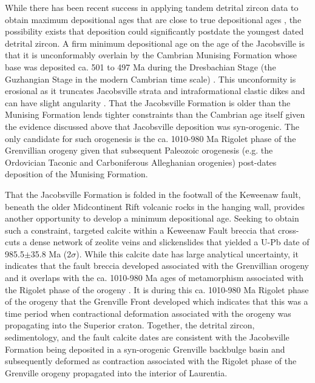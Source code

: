 \documentclass[draft]{agujournal2019}
\begin{document}
While there has been recent success in applying tandem detrital zircon data to obtain maximum depositional ages that are close to true depositional ages \cite{Karlstrom2020a}, the possibility exists that deposition could significantly postdate the youngest dated detrital zircon. A firm minimum depositional age on the age of the Jacobsville is that it is unconformably overlain by the Cambrian Munising Formation whose base was deposited ca. 501 to 497 Ma during the Dresbachian Stage (the Guzhangian Stage in the modern Cambrian time scale) \cite{Hamblin1958a, Haddox1990a}. This unconformity is erosional as it truncates Jacobsville strata and intraformational clastic dikes and can have slight angularity \cite{Hamblin1958a, Haddox1990a}. That the Jacobsville Formation is older than the Munising Formation lends tighter constraints than the Cambrian age itself given the evidence discussed above that Jacobsville deposition was syn-orogenic. The only candidate for such orogenesis is the ca. 1010-980 Ma Rigolet phase of the Grenvillian orogeny given that subsequent Paleozoic orogenesis (e.g. the Ordovician Taconic and Carboniferous Alleghanian orogenies) post-dates deposition of the Munising Formation.

That the Jacobsville Formation is folded in the footwall of the Keweenaw fault, beneath the older Midcontinent Rift volcanic rocks in the hanging wall, provides another opportunity to develop a minimum depositional age. Seeking to obtain such a constraint,  targeted calcite within a Keweenaw Fault breccia that cross-cuts a dense network of zeolite veins and slickenslides that yielded a U-Pb date of 985.5$\pm$35.8 Ma (2$\sigma$). While this calcite date has large analytical uncertainty, it indicates that the fault breccia developed associated with the Grenvillian orogeny and it overlaps with the ca. 1010-980 Ma ages of metamorphism associated with the Rigolet phase of the orogeny \cite{Swanson-Hysell2023a}. It is during this ca. 1010-980 Ma Rigolet phase of the orogeny that the Grenville Front developed \cite{Rivers2008a} which indicates that this was a time period when contractional deformation associated with the orogeny was propagating into the Superior craton. Together, the detrital zircon, sedimentology, and the fault calcite dates are consistent with the Jacobsville Formation being deposited in a syn-orogenic Grenville backbulge basin and subsequently deformed as contraction associated with the Rigolet phase of the Grenville orogeny propagated into the interior of Laurentia. 
\end{document}
